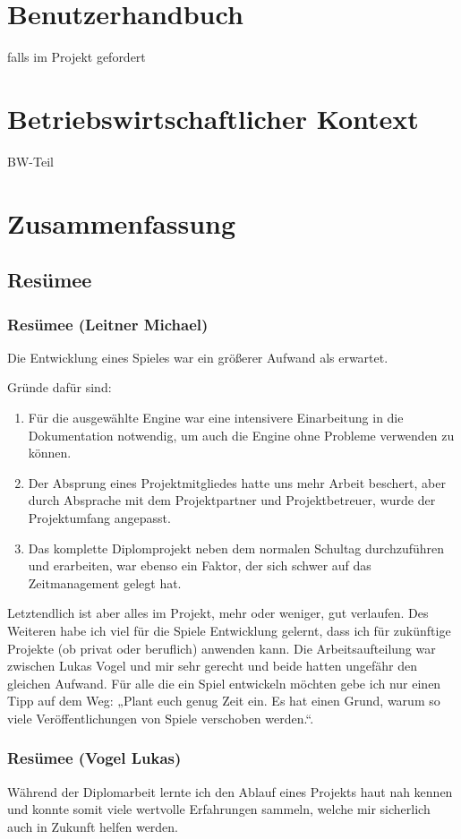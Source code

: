 \chapter{Benutzerhandbuch} 
falls im Projekt gefordert

\chapter{Betriebswirtschaftlicher Kontext}
BW-Teil

\chapter{Zusammenfassung}
\section{Resümee}
\subsection{Resümee (Leitner Michael)}
Die Entwicklung eines Spieles war ein größerer Aufwand als erwartet.

Gründe dafür sind:
\begin{enumerate}
	\item Für die ausgewählte Engine war eine intensivere Einarbeitung in die Dokumentation notwendig, um auch die Engine ohne Probleme verwenden zu können.
	\item Der Absprung eines Projektmitgliedes hatte uns mehr Arbeit beschert, aber durch Absprache mit dem Projektpartner und Projektbetreuer, wurde der Projektumfang angepasst.
	\item Das komplette Diplomprojekt neben dem normalen Schultag durchzuführen und erarbeiten, war ebenso ein Faktor, der sich schwer auf das Zeitmanagement gelegt hat.
\end{enumerate}
	
Letztendlich ist aber alles im Projekt, mehr oder weniger, gut verlaufen. Des Weiteren habe ich viel für die Spiele Entwicklung gelernt, dass ich für zukünftige Projekte (ob privat oder beruflich) anwenden kann. Die Arbeitsaufteilung war zwischen Lukas Vogel und mir sehr gerecht und beide hatten ungefähr den gleichen Aufwand. Für alle die ein Spiel entwickeln möchten gebe ich nur einen Tipp auf dem Weg: „Plant euch genug Zeit ein. Es hat einen Grund, warum so viele Veröffentlichungen von Spiele verschoben werden.“.

\subsection{Resümee (Vogel Lukas)}
Während der Diplomarbeit lernte ich den Ablauf eines Projekts haut nah kennen und konnte somit viele wertvolle Erfahrungen sammeln, welche mir sicherlich auch in Zukunft helfen werden.

